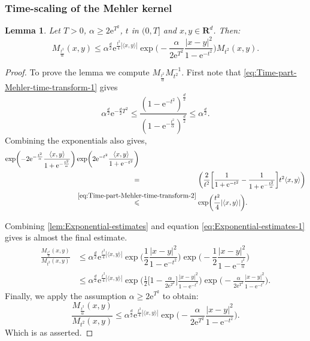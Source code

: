 \documentclass[a4paper,oneside,10pt]{amsproc}
\theoremstyle{plain}
\newtheorem{lemma}{Lemma}
\theoremstyle{remark}
\theoremstyle{definition}
\newcommand{\la}{\langle}
\newcommand{\ra}{\rangle}
\renewcommand{\leq}{\leqslant}
\renewcommand{\leq}{\leqslant}
\renewcommand{\geq}{\geqslant}
\newcommand{\R}{\mathbf R}
\newcommand{\e}{\mathrm{e}} %
\renewcommand{\leq}{\leqslant}%
\renewcommand{\geq}{\geqslant}%
\begin{document}
\subsubsection{Time-scaling of the Mehler kernel}
\begin{lemma}\label{lem:Kernel-estimates-1}
 Let $T > 0$, $\alpha \geq 2 \e^{T^2}$, $t$ in $(0, T]$ and $x, y \in
 \R^d$. Then:
  \begin{equation}
    \label{eq:Kernel-lemma-1-estimate} 
    M_{\frac{t^2}{\alpha}}(x, y) \leq \alpha^{\frac{d}2}
    \e^{\frac{t^2}4 |\la x, y \ra|} \exp\biggl (-\frac{\alpha}{2
      \e^{T^2}} \frac{|x - y|^2}{1 - \e^{-t^2}} \biggr ) M_{t^2}(x,
    y).
  \end{equation}
\end{lemma}
\begin{proof}
  To prove the lemma we compute $M_{\frac{t^2}{\alpha}} M_{t^2}^{-1}$.
  First note that \eqref{eq:Time-part-Mehler-time-transform-1} gives
  \begin{equation*}
        \alpha^{\frac{d}2} \e^{-\frac{d}2 T^2} \leq \frac{(1 - \e^{-t^2})^{\frac{d}2}}{(1 -
          \e^{-\frac{t^2}{\alpha}})^{\frac{d}2}} \leq \alpha^{\frac{d}2}.
  \end{equation*}
  Combining the exponentials also gives,
  \begin{align*}
    \exp \biggl (-2\e^{-\frac{t^2}\alpha} \frac{\la x, y \ra}{1 + \e^{-\frac{t^2}{\alpha}}}
    \biggr ) &\exp \biggl (2 \e^{-t^2} \frac{\la x, y \ra}{1 + \e^{-t^2}}
    \biggr )\\
    &\stackrel{\phantom{\eqref{eq:Time-part-Mehler-time-transform-2}}}{=}
    \biggl (\frac2{t^2}\biggl[\frac{1}{1 + \e^{-t^2}} - \frac{1}{1 +
      \e^{-\frac{t^2}{\alpha}}} \biggr] t^2 \la x, y \ra \biggr)\\
    &\stackrel{\eqref{eq:Time-part-Mehler-time-transform-2}}{\leq}
    \exp\biggl (\frac{t^2}4 |\la x, y \ra| \biggr).
  \end{align*}

  Combining \autoref{lem:Exponential-estimates} and equation
  \eqref{eq:Exponential-estimates-1} gives is almost the final estimate.
  \begin{align*}
    \frac{M_{\frac{t^2}{\alpha}}(x, y)}{M_{t^2}(x, y)} &\leq
    \alpha^{\frac{d}2} \e^{\frac{t^2}4 |\la x, y \ra|} \exp\biggl(\dfrac12 \dfrac{|x - y|^2}{1 -
      \e^{-t^2}} \biggr) \exp\biggl(-\dfrac12 \dfrac{|x - y|^2}{1
      - \e^{-\frac{t^2}{\alpha}}}  \biggr)\\
    &\leq \alpha^{\frac{d}2} \e^{\frac{t^2}4 |\la x, y \ra|} \exp \biggl (\frac12 \biggl[1
    -\frac{\alpha}{2\e^{T^2}} \biggr] \frac{|x - y|^2}{1 - \e^{-t^2}}
    \biggr ) \exp \biggl (-\frac{\alpha}{2\e^{T^2}} \frac{|x - y|^2}{1
      - \e^{-t^2}} \biggr ).
  \end{align*}
  Finally, we apply the assumption $\alpha \geq 2 \e^{T^2}$ to obtain:
  \begin{equation*}
    \frac{M_{\frac{t^2}{\alpha}}(x, y)}{M_{t^2}(x, y)} \leq \alpha^{\frac{d}2}
    \e^{\frac{t^2}4 |\la x, y \ra|} \exp\biggl(-\frac{\alpha}{2\e^{T^2}} \frac{|x -
      y|^2}{1 - \e^{-t^2}} \biggr).
  \end{equation*}
  Which is as asserted.
\end{proof}
\end{document}
